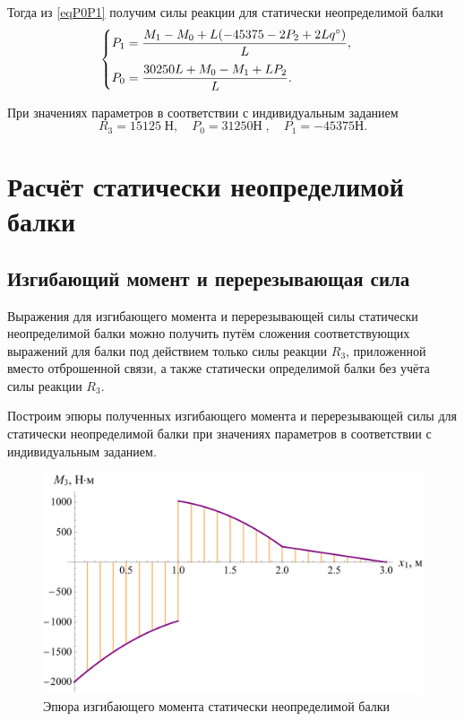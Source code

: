 \documentclass[12pt, a4paper]{article}
\begin{document}
	Тогда из \eqref{eqP0P1} получим силы реакции для статически неопределимой балки
	\begin{equation*}
		\begin{cases}\vspace{0.75em}
			P_1 = \dfrac{M_1 - M_0 + L (-45375 - 2 P_2 + 2 L  q^{\circ})}{L}, \\
			P_0 = \dfrac{30250 L + M_0 - M_1 + L P_2}{L}.\\
		\end{cases}
	\end{equation*}
	
	При значениях параметров в соответствии с индивидуальным заданием
	\vspace{-0.5em}
	\[
	R_3 = 15125 \; \text{Н}, \quad P_0 = 31250 \text{Н}\;, \quad P_1 = -45375 \text{Н}.
	\]
	
	\vspace{-1.5em}
	
	\section{Расчёт статически неопределимой балки}
	\subsection{Изгибающий момент и перерезывающая сила}
	
	Выражения для изгибающего момента и перерезывающей силы статически неопределимой балки можно получить путём сложения соответствующих выражений для балки под действием только силы реакции $R_3$, приложенной вместо отброшенной связи, а также статически определимой балки без учёта силы реакции $R_3$. 
	
	Построим эпюры полученных изгибающего момента и перерезывающей силы для статически неопределимой балки при значениях параметров в соответствии с индивидуальным заданием.
	
	\newpage
	
	\begin{figure}[!h]
		\centering
		\includegraphics[width=0.75\linewidth]{plot-10}
		\caption{Эпюра изгибающего момента статически неопределимой балки}
	\end{figure} 
	
\end{document}
